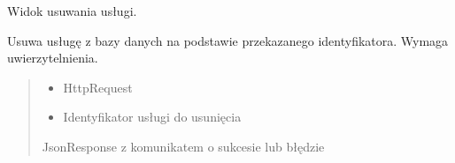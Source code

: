 \documentclass[letterpaper,10pt,polish]{sphinxmanual}
\begin{document}

\begin{fulllineitems}
\label{\detokenize{mainApp:mainApp.views.delete_service}}
\pysigstartsignatures
{}
\pysigstopsignatures
\sphinxAtStartPar
Widok usuwania usługi.

\sphinxAtStartPar
Usuwa usługę z bazy danych na podstawie przekazanego identyfikatora.
Wymaga uwierzytelnienia.
\begin{quote}\begin{description}
\begin{itemize}
\item {} 
\sphinxAtStartPar
{} \textendash{} HttpRequest

\item {} 
\sphinxAtStartPar
{} \textendash{} Identyfikator usługi do usunięcia

\end{itemize}

\sphinxAtStartPar
JsonResponse z komunikatem o sukcesie lub błędzie

\end{description}\end{quote}

\end{fulllineitems}

\end{document}
